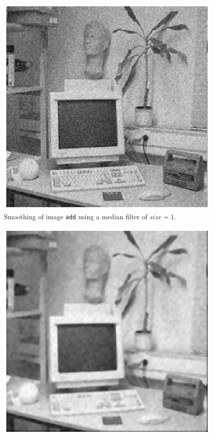 \begin{minipage}{\linewidth}
  \begin{minipage}{0.4\linewidth}
    \begin{figure}[H]
      \includegraphics[scale=0.6]{./images/Q17/medfilt/add_1.eps}
      \caption{Smoothing of image \texttt{add} using a median filter of $size=1$.}
      \label{fig:Q17_medfilt_add_1}
    \end{figure}
  \end{minipage}
  \hspace{0.05\linewidth}
  \begin{minipage}{0.4\linewidth}
    \begin{figure}[H]
      \includegraphics[scale=0.6]{./images/Q17/medfilt/add_4.eps}

\end{figure}
\end{minipage}
\end{minipage}
